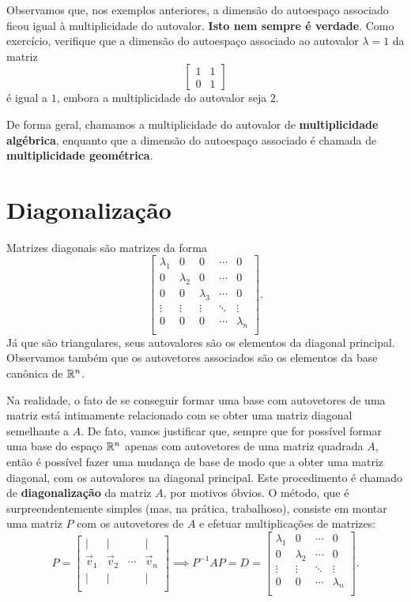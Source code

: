 \documentclass[../livro.tex]{subfiles}  %
\begin{document}
Observamos que, nos exemplos anteriores, a dimensão do autoespaço associado ficou igual à multiplicidade do autovalor. \textbf{Isto nem sempre é verdade}. Como exercício, verifique que a dimensão do autoespaço associado ao autovalor $\lambda = 1$ da matriz
\[
\begin{bmatrix}
1 & 1 \\ 0 & 1
\end{bmatrix}
\] é igual a $1$, embora a multiplicidade do autovalor seja $2$.

De forma geral, chamamos a multiplicidade do autovalor de \textbf{multiplicidade algébrica}, enquanto que a dimensão do autoespaço associado é chamada de \textbf{multiplicidade geométrica}.


\section{Diagonalização}

Matrizes diagonais são matrizes da forma
\[
\begin{bmatrix}
\lambda_1 & 0 & 0 & \cdots & 0 \\
0 & \lambda_2 & 0 & \cdots & 0 \\
0 & 0 & \lambda_3 & \cdots & 0 \\
\vdots & \vdots & \vdots & \ddots & \vdots \\
0 & 0 & 0 & \cdots & \lambda_n \\
\end{bmatrix}.
\] Já que são triangulares, seus autovalores são os elementos da diagonal principal. Observamos também que os autovetores associados são os elementos da base canônica de $\mathbb{R}^n$.

Na realidade, o fato de se conseguir formar uma base com autovetores de uma matriz está intimamente relacionado com se obter uma matriz diagonal semelhante a $A$. De fato, vamos justificar que, sempre que for possível formar uma base do espaço $\mathbb{R}^n$ apenas com autovetores de uma matriz quadrada $A$, então é possível fazer uma mudança de base de modo que a obter uma matriz diagonal, com os autovalores na diagonal principal. Este procedimento é chamado de \textbf{diagonalização} da matriz $A$, por motivos óbvios. O método, que é surpreendentemente simples (mas, na prática, trabalhoso), consiste em montar uma matriz $P$ com os autovetores de $A$ e efetuar multiplicações de matrizes:
\[
P = \begin{bmatrix}
| & | &  & | \\
\vec{v}_1 & \vec{v}_2 & \cdots & \vec{v}_n \\
| & | &  & |\\
\end{bmatrix} \implies P^{-1} A P = D = \begin{bmatrix}
\lambda_1 & 0  & \cdots & 0 \\
0 & \lambda_2  & \cdots & 0 \\
\vdots & \vdots & \ddots & \vdots \\
0 & 0 & \cdots & \lambda_n \\
\end{bmatrix}.
\]
\end{document}
